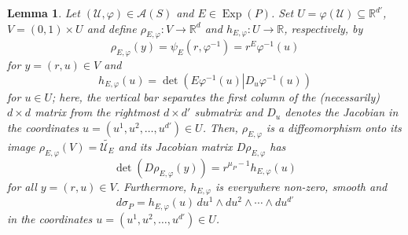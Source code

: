 \documentclass[11pt]{article}
\newtheorem{lemma}[theorem]{Lemma}
\theoremstyle{remark}
\newcommand\Exp{\operatorname{Exp}}
\renewcommand\det{\operatorname{det}}
\begin{document}
\begin{lemma}\label{lem:JacobianRelation}
Let $(\mathcal{U},\varphi)\in \mathcal{A}(S)$ and $E\in\Exp(P)$. Set $U=\varphi(\mathcal{U})\subseteq\mathbb{R}^{d'}$, $V=(0,1)\times U$ and define $\rho_{E,\varphi}:V\to \mathbb{R}^d$ and $h_{E,\varphi}:U\to \mathbb{R}$, respectively, by
\begin{equation*}
    \rho_{E,\varphi}(y)=\psi_E(r,\varphi^{-1})=r^E\varphi^{-1}(u)
\end{equation*}
for $y=(r,u)\in V$ and
\begin{equation*}
    h_{E,\varphi}(u)=\det\left.\left(E\varphi^{-1}(u)\right\vert D_u\varphi^{-1}(u)\right)
\end{equation*}
for $u\in U$; here, the vertical bar separates the first column of the (necessarily) $d\times d$ matrix from the rightmost $d\times d'$ submatrix and $D_u$ denotes the Jacobian in the coordinates $u=(u^1,u^2,\dots,u^{d'})\in U$. Then, $\rho_{E,\varphi}$ is a diffeomorphism onto its image $\rho_{E,\varphi}(V)=\widetilde{\mathcal{U}_E}$ and its Jacobian matrix $D\rho_{E,\varphi}$ has
\begin{equation}\label{eq:JacobianRelation1}
    \det(D\rho_{E,\varphi}(y))=r^{\mu_P-1}h_{E,\varphi}(u)
\end{equation}
for all $y=(r,u)\in V$. Furthermore, $h_{E,\varphi}$ is everywhere non-zero, smooth and
\begin{equation}\label{eq:JacobianRelation2}
    d\sigma_P=h_{E,\varphi}(u)\,du^1\wedge du^2\wedge\cdots\wedge du^{d'}
\end{equation}
in the coordinates $u=(u^1,u^2,\dots,u^{d'})\in U$. 
\end{lemma}
\end{document}

